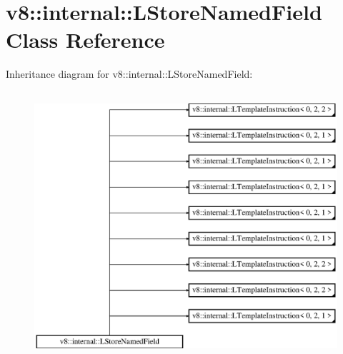 \hypertarget{classv8_1_1internal_1_1_l_store_named_field}{}\section{v8\+:\+:internal\+:\+:L\+Store\+Named\+Field Class Reference}
\label{classv8_1_1internal_1_1_l_store_named_field}
Inheritance diagram for v8\+:\+:internal\+:\+:L\+Store\+Named\+Field\+:\begin{figure}[H]
\begin{center}
\leavevmode
\includegraphics[height=10.000000cm]{classv8_1_1internal_1_1_l_store_named_field}
\end{center}
\end{figure}
